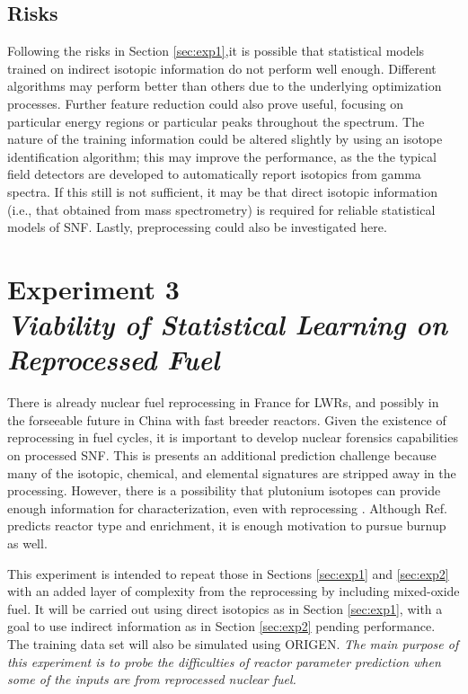 \subsection*{Risks}

Following the risks in Section \ref{sec:exp1},it is possible that statistical models trained on indirect isotopic information
do not perform well enough. Different algorithms may perform
better than others due to the underlying optimization processes. Further
feature reduction could also prove useful, focusing on particular energy
regions or particular peaks throughout the spectrum. The nature of the
training information could be altered slightly by using an isotope
identification algorithm; this may improve the performance, as the the typical field detectors are
developed to automatically report isotopics from gamma spectra. If this still
is not sufficient, it may be that direct isotopic information (i.e., that
obtained from mass spectrometry) is required for reliable statistical models of
\gls{SNF}.  Lastly, preprocessing could also be investigated here.

\section[Experiment 3: Other Fuel Cycle Flows]{Experiment 3\\ 
\large{\textit{Viability of Statistical Learning on Reprocessed Fuel}}}
\label{sec:exp3}

There is already nuclear fuel reprocessing in France for \gls{LWR}s, and
possibly in the forseeable future in China with fast breeder reactors.  Given
the existence of reprocessing in fuel cycles, it is important to develop
nuclear forensics capabilities on processed \gls{SNF}. This is presents an
additional prediction challenge because many of the isotopic, chemical, and
elemental signatures are stripped away in the processing. However, there is a
possibility that plutonium isotopes can provide enough information for
characterization, even with reprocessing \cite{pu_discrimination}. Although
Ref. \cite{pu_discrimination} predicts reactor type and enrichment, it is
enough motivation to pursue burnup as well. 

This experiment is intended to repeat those in Sections \ref{sec:exp1} and
\ref{sec:exp2} with an added layer of complexity from the reprocessing by
including mixed-oxide fuel.  It will be carried out using direct isotopics as
in Section \ref{sec:exp1}, with a goal to use indirect information as in
Section \ref{sec:exp2} pending performance. The training data set will also be
simulated using \gls{ORIGEN}.  \textit{The main purpose of this experiment is
to probe the difficulties of reactor parameter prediction when some of the
inputs are from reprocessed nuclear fuel.}

